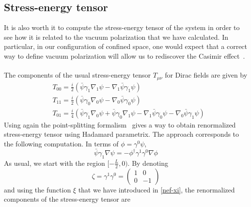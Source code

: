 \subsection{Stress-energy tensor}
It is also worth it to compute the stress-energy tensor of the system in order to see how it is related to the vacuum polarization that we have calculated.
In particular, in our configuration of confined space, one would expect that a correct way to define vacuum polarization will allow us to rediscover the Casimir effect~\cite{Casimir1948}.\\\\
%
The components of the usual stress-energy tensor $T_{\mu\nu}$ for Dirac fields are given by
\begin{equation}
\begin{split}
& T_{00} = \frac{i}{2} (\bar{\psi} \gamma_1 \nabla_1 \psi - \nabla_1 \bar{\psi}\gamma_1 \psi)  \\
& T_{11} = \frac{i}{2} (\bar{\psi} \gamma_0 \nabla_0 \psi - \nabla_0 \bar{\psi}\gamma_0 \psi)  \\
& T_{01} = \frac{i}{4} (\bar{\psi} \gamma_1 \nabla_0 \psi +\bar{\psi} \gamma_0 \nabla_1 \psi - \nabla_1 \bar{\psi}\gamma_0 \psi - \nabla_0 \bar{\psi}\gamma_1 \psi)  
\end{split}
\end{equation}
Using again the point-splitting formalism~\cite{Dappiaggi2009} gives a way to obtain renormalized stress-energy tensor using Hadamard parametrix.
The approach corresponds to the following computation.
In terms of $\phi = \gamma^0 \psi$, 
\begin{equation*}
\bar{\psi} \gamma_1 \nabla \psi = - \phi^\dagger \gamma^1 \gamma^0 \nabla \phi
\end{equation*}
As usual, we start with the region $[-\frac{L}{2}, 0)$. By denoting
\begin{equation*}
\zeta = \gamma^1 \gamma^0 = \begin{pmatrix}
1 & 0 \\
0 & -1
\end{pmatrix}
\end{equation*}
and using the function $\xi$ that we have introduced in \cref{nef-xi}, 
the renormalized components of the stress-energy tensor are
